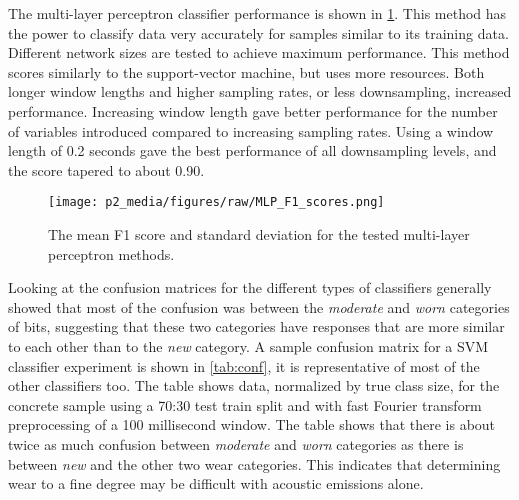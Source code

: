 The multi-layer perceptron classifier performance is shown in \ref{fig:perf_MLP}.
This method has the power to classify data very accurately for samples similar to its training data.
Different network sizes are tested to achieve maximum performance.
This method scores similarly to the support-vector machine, but uses more resources.
Both longer window lengths and higher sampling rates, or less downsampling, increased performance.
Increasing window length gave better performance for the number of variables introduced
compared to increasing sampling rates.
Using a window length of 0.2 seconds gave the best performance of all downsampling levels,
and the score tapered to about 0.90.

\begin{figure}[h]
\centering
\texttt{[image: p2\_media/figures/raw/MLP\_F1\_scores.png]}
\caption{
The mean F1 score and standard deviation for the tested multi-layer perceptron methods.
}
\label{fig:perf_MLP}
\end{figure}


Looking at the confusion matrices for the different types of classifiers generally showed
that most of the confusion was between the \textit{moderate} and \textit{worn} categories of bits, suggesting that
these two categories have responses that are more similar to each other than to the \textit{new} category.
A sample confusion matrix for a SVM classifier experiment is shown in \ref{tab:conf}, 
it is representative of most of the other classifiers too. 
The table shows data, normalized by true class size, for the concrete sample using a 70:30 test train split
and with fast Fourier transform preprocessing of a 100 millisecond window.
The table shows that there is about twice as much confusion between \textit{moderate} and \textit{worn} categories as there is 
between \textit{new} and the other two wear categories.
This indicates that determining wear to a fine degree may be difficult with acoustic emissions alone.

